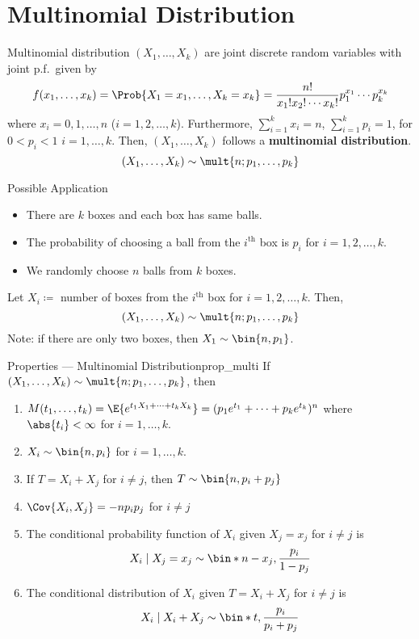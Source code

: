 \section{Multinomial Distribution}
\begin{Definition}{Multinomial distribution}{}
    $ (X_1,\ldots,X_k) $ are joint discrete
    random variables with joint p.f.\ given by
    \[ f(x_1,\ldots,x_k)=\Prob{X_1=x_1,\ldots,X_k=x_k}=
        \frac{n!}{x_1!x_2!\cdots x_k!}p_1^{x_1}\cdots p_k^{x_k} \]
    where $ x_i=0,1,\ldots,n $ ($ i=1,2,\ldots,k $). Furthermore,
    $ \sum_{i=1}^{k}x_i=n $, $ \sum_{i=1}^{k} p_i=1 $,
    for $ 0<p_i<1 $ $ i=1,\ldots,k $. Then,
    $ (X_1,\ldots,X_k) $ follows a \textbf{multinomial distribution}.
    \[ (X_1,\ldots,X_k)\sim \mult{n;p_1,\ldots,p_k} \]
\end{Definition}
\begin{Example}{Possible Application}{}
    \begin{itemize}
        \item There are $ k $ boxes and each box
              has same balls.
        \item The probability of choosing a ball from the
              $ i^{\text{th}} $ box is $ p_i $ for $ i=1,2,\ldots,k $.
        \item We randomly choose $ n $ balls from $ k $ boxes.
    \end{itemize}
    Let $ X_i\coloneq $ number of boxes from the
    $ i^{\text{th}} $ box for $ i=1,2,\ldots,k $. Then,
    \[ (X_1,\ldots,X_k) \sim \mult{n;p_1,\ldots,p_k} \]
    Note: if there are only two boxes, then $ X_1\sim \bin{n,p_1} $.
\end{Example}
\begin{Proposition}{Properties --- Multinomial Distribution}{prop_multi}
    If $ (X_1,\ldots,X_k) \sim \mult{n;p_1,\ldots,p_k} $, then
    \begin{enumerate}[label=(\arabic*)]
        \item\label{prop_multi1} $ M(t_1,\ldots,t_k)=\E{e^{t_1 X_1+\cdots+t_k X_k}}=
                  (p_1e^{t_1}+\cdots+p_k e^{t_k})^n $
              where $ \abs{t_i}<\infty $ for $ i=1,\ldots,k $.
        \item\label{prop_multi2} $ X_i \sim \bin{n,p_i} $ for $ i=1,\ldots,k $.
        \item\label{prop_multi3} If $ T=X_i+X_j $ for $ i\neq j $, then
              $ T \sim \bin{n,p_i+p_j} $
        \item\label{prop_multi4} $ \Cov{X_i,X_j}=-n p_i p_j  $
              for $ i\neq j $
        \item\label{prop_multi5} The conditional probability
              function of $ X_i $ given $ X_j=x_j $ for $ i\neq j $ is
              \[ X_i\mid X_j=x_j \sim \bin*{n-x_j,
                      \frac{p_i}{1-p_j}} \]
        \item\label{prop_multi6} The conditional distribution of $ X_i $
              given $ T=X_i+X_j $ for $ i\neq j $ is
              \[ X_i\mid X_i+X_j \sim \bin*{t,\frac{p_i}{p_i+p_j} } \]
    \end{enumerate}
\end{Proposition}

